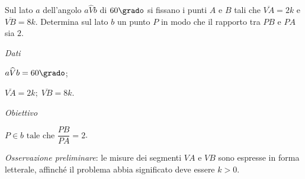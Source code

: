 \begin{problema}
Sul lato $ a $ dell’angolo $ a \widehat{V} b $ di $ 60\grado $ si fissano i punti $ A $ e $ B $ tali che $ \overline{VA } = 2 k $ e $ \overline {VB} = 8 k $.
Determina sul lato $ b $ un punto $ P $ in modo che il rapporto tra $ PB $ e $ PA $ sia $ 2 $.
\end{problema}

\begin{multicols}{2}
\emph{Dati}

$a \widehat{V} b = 60\grado$;

$\overline {VA} = 2 k; \;
 \overline {VB} = 8 k $.

\emph{Obiettivo}

$P \in b \text{ tale che } \dfrac{PB}{PA} = 2$.
\begin{center}
 
\end{center}

\end{multicols}
\emph{Osservazione preliminare}: le misure dei segmenti $ VA $ e $ VB $ sono espresse in forma letterale, affinché il problema abbia significato deve essere
$k > 0$.

